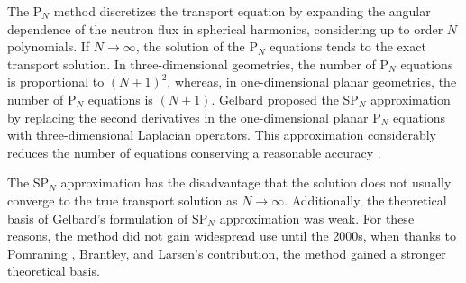 \documentclass{anstrans}
\begin{document}
The P$_N$ method \cite{davidson_neutron_1957} discretizes the transport equation by expanding the angular dependence of the neutron flux in spherical harmonics, considering up to order $N$ polynomials.
If $N \rightarrow \infty$, the solution of the P$_N$ equations tends to the exact transport solution.
In three-dimensional geometries, the number of P$_N$ equations is proportional to $(N+1)^2$, whereas, in one-dimensional planar geometries, the number of P$_N$ equations is $(N+1)$.
Gelbard \cite{gelbard_spherical_1960} proposed the SP$_N$ approximation by replacing the second derivatives in the one-dimensional planar P$_N$ equations with three-dimensional Laplacian operators.
This approximation considerably reduces the number of equations conserving a reasonable accuracy \cite{capilla_applications_2009}.

The SP$_N$ approximation has the disadvantage that the solution does not usually converge to the true transport solution as $N \rightarrow \infty$.
Additionally, the theoretical basis of Gelbard's formulation of SP$_N$ approximation was weak.
For these reasons, the method did not gain widespread use until the 2000s, when thanks to Pomraning \cite{pomraning_asymptotic_1993}, Brantley, and Larsen's \cite{brantley_simplifiedP3_2000} contribution, the method gained a stronger theoretical basis.
\end{document}
